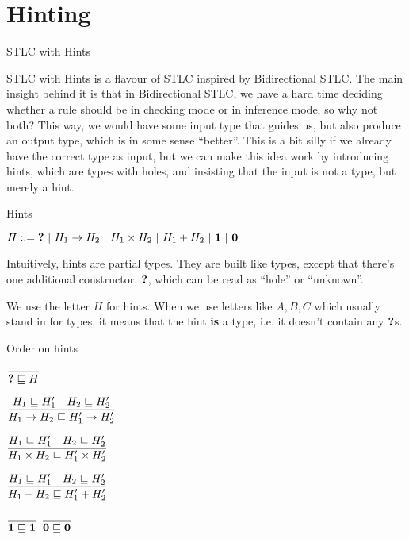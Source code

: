 \documentclass{beamer}
\begin{document}
\section{Hinting}

\begin{frame}{STLC with Hints}

STLC with Hints is a flavour of STLC inspired by Bidirectional STLC. The main insight behind it is that in Bidirectional STLC, we have a hard time deciding whether a rule should be in checking mode or in inference mode, so why not both? This way, we would have some input type that guides us, but also produce an output type, which is in some sense ``better''. This is a bit silly if we already have the correct type as input, but we can make this idea work by introducing hints, which are types with holes, and insisting that the input is not a type, but merely a hint.

\end{frame}

\begin{frame}{Hints}

$H ::= \textbf{?} \ |\  H_1 \to H_2 \ |\  H_1 \times H_2 \ |\  H_1 + H_2 \ |\  \textbf{1} \ |\  \textbf{0}$

\vspace{2em}

Intuitively, hints are partial types. They are built like types, except that there's one additional constructor, $\textbf{?}$, which can be read as ``hole'' or ``unknown''.

\vspace{2em}

We use the letter $H$ for hints. When we use letters like $A, B, C$ which usually stand in for types, it means that the hint \textbf{is} a type, i.e. it doesn't contain any $\textbf{?}$s.

\end{frame}

\begin{frame}{Order on hints}

\begin{center}
  $\displaystyle \frac{}{\textbf{?} \sqsubseteq H} \textsc{\footnotesize{}}$

  \vspace{2em}

  $\displaystyle \frac{H_1 \sqsubseteq H_1' \quad H_2 \sqsubseteq H_2'}{H_1 \to H_2 \sqsubseteq H'_1 \to H'_2} \textsc{\footnotesize{}}$

  \vspace{2em}

  $\displaystyle \frac{H_1 \sqsubseteq H_1' \quad H_2 \sqsubseteq H_2'}{H_1 \times H_2 \sqsubseteq H_1' \times H_2'} \textsc{\footnotesize{}}$

  \vspace{2em}

  $\displaystyle \frac{H_1 \sqsubseteq H_1' \quad H_2 \sqsubseteq H_2'}{H_1 + H_2 \sqsubseteq H_1' + H_2'} \textsc{\footnotesize{}}$

  \vspace{2em}

  $\displaystyle \frac{}{\textbf{1} \sqsubseteq \textbf{1}} \textsc{\footnotesize{}}$ \quad
  $\displaystyle \frac{}{\textbf{0} \sqsubseteq \textbf{0}} \textsc{\footnotesize{}}$
\end{center}

\end{frame}
\end{document}
